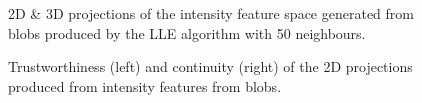 \begin{figure}[H]
	\centering
	\caption{2D \& 3D projections of the intensity feature space generated from blobs produced by the LLE algorithm with 50 neighbours.}\label{fig:intensity_LLE_mapping}
\end{figure}
\clearpage

\clearpage
\begin{figure}[H]
	\centering
	\caption{Trustworthiness (left) and continuity (right) of the 2D projections produced from intensity features from blobs.}\label{fig:TC_2d_intensity}
\end{figure}

